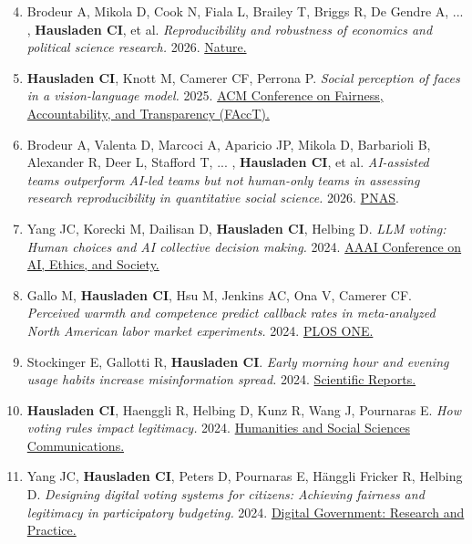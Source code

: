 \documentclass[11pt]{article}
\begin{document}
\begin{enumerate}[parsep=0pt]
\setcounter{enumi}{3}

\item Brodeur A, Mikola D, Cook N, Fiala L, Brailey T, Briggs R, De Gendre A, ... , \textbf{Hausladen CI}, et al. {\em Reproducibility and robustness of economics and political science research.} 2026. \href{https://www.nature.com/articles/s41586-026-10251-x}{Nature.}

\item \textbf{Hausladen CI}, Knott M, Camerer CF, Perrona P. {\em Social perception of faces in a vision-language model.} 2025.
\href{https://arxiv.org/abs/2408.14435}{ACM Conference on Fairness, Accountability, and Transparency (FAccT).} 

\item Brodeur A, Valenta D, Marcoci A, Aparicio JP, Mikola D, Barbarioli B, Alexander R, Deer L, Stafford T, ... , \textbf{Hausladen CI}, et al. {\em AI-assisted teams outperform AI-led teams but not human-only teams in assessing research reproducibility in quantitative social science.} 2026. \href{https://www.pnas.org/doi/10.1073/pnas.2524747123}{PNAS}.

\item Yang JC, Korecki M, Dailisan D, \textbf{Hausladen CI}, Helbing D. {\em LLM voting: Human choices and AI collective decision making.} 2024.  
\href{https://doi.org/10.48550/arXiv.2402.01766}{AAAI Conference on AI, Ethics, and Society.}  

\item Gallo M, \textbf{Hausladen CI}, Hsu M, Jenkins AC, Ona V, Camerer CF. {\em Perceived warmth and competence predict callback rates in meta-analyzed North American labor market experiments.} 2024.
\href{https://doi.org/10.1371/journal.pone.0304723}{PLOS ONE.}  

\item Stockinger E, Gallotti R, \textbf{Hausladen CI}. {\em Early morning hour and evening usage habits increase misinformation spread.} 2024.  
\href{https://www.nature.com/articles/s41598-024-69447-8}{Scientific Reports.}  

\item \textbf{Hausladen CI}, Haenggli R, Helbing D, Kunz R, Wang J, Pournaras E. {\em How voting rules impact legitimacy.} 2024.  
\href{https://doi.org/10.1057/s41599-024-03056-8}{Humanities and Social Sciences Communications.}  

\item Yang JC, \textbf{Hausladen CI}, Peters D, Pournaras E, Hänggli Fricker R, Helbing D. {\em Designing digital voting systems for citizens: Achieving fairness and legitimacy in participatory budgeting.} 2024.  
\href{https://dl.acm.org/doi/abs/10.1145/3665332}{Digital Government: Research and Practice.} 


\end{enumerate}
\end{document}
